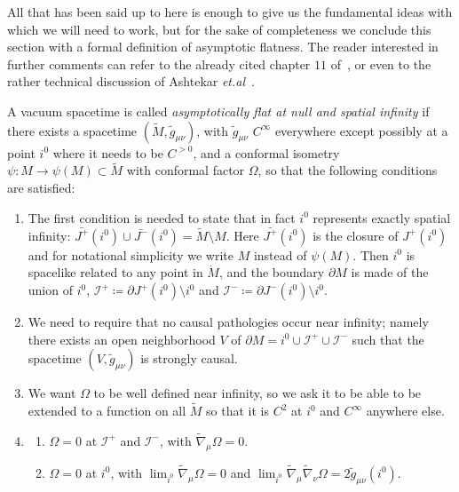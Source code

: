 All that has been said up to here is enough to give us the fundamental ideas with which we will need to work, but for the sake of completeness we conclude this section with a formal definition of asymptotic flatness. The reader interested in further comments can refer to the already cited chapter \(11\) of~\cite{wald2010general}, or even to the rather technical discussion of Ashtekar \emph{et.al}~\cite{ashtekar1978unified}.
\begin{definition}
	A vacuum spacetime is called \emph{asymptotically flat at null and spatial infinity} if there exists a spacetime \((\tilde{M}, \tilde{g}_{\mu\nu})\), with \(\tilde{g}_{\mu\nu}\) \(C^{\infty}\) everywhere except possibly at a point \(i^0\) where it needs to be \(C^{>0}\), and a conformal isometry \(\psi: M \rightarrow \psi(M)\subset \tilde{M}\) with conformal factor \(\Omega\), so that the following conditions are satisfied:
	\begin{enumerate}[label=(\arabic*)]
		\item The first condition is needed to state that in fact \(i^0\) represents exactly spatial infinity: \(\bar{J^+}(i^0) \cup \bar{J^-}(i^0) = \tilde{M} \setminus M\). Here \(\bar{J^+}(i^0)\) is the closure of \(J^+(i^0)\) and for notational simplicity we write \(M\) instead of \(\psi(M)\). Then \(i^0\) is spacelike related to any point in \(\dot{M}\), and the boundary \(\partial M\) is made of the union  of \(i^0\), \(\mathscr{I}^+ \coloneqq \partial J^+(i^0) \setminus i^0\) and \(\mathscr{I}^- \coloneqq \partial J^-(i^0) \setminus i^0\).
		\item We need to require that no causal pathologies occur near infinity; namely there exists an open neighborhood \(V\) of \(\partial M = i^0 \cup \mathscr{I}^+ \cup \mathscr{I}^-\) such that the spacetime \((V, \tilde{g}_{\mu\nu})\) is strongly causal.
		\item We want \(\Omega\) to be well defined near infinity, so we ask it to be able to be extended to a function on all \(\tilde{M}\) so that it is \(C^2\) at \(i^0\) and \(C^{\infty}\) anywhere else.
		\item \begin{enumerate}
			\item \(\Omega = 0\) at \(\mathscr{I}^+\) and \(\mathscr{I}^-\), with \(\tilde{\nabla}_{\mu} \Omega = 0\).
			\item \(\Omega = 0\) at \(i^0\), with \(\lim_{i^0} \tilde{\nabla}_{\mu} \Omega = 0\) and \(\lim_{i^0} \tilde{\nabla}_{\mu} \tilde{\nabla}_{\nu}\Omega = 2\tilde{g}_{\mu\nu}(i^0)\).
			\end{enumerate}

\end{enumerate}
\end{definition}
